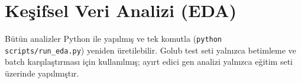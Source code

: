 


\section{Keşifsel Veri Analizi (EDA)}
Bütün analizler Python ile yapılmış ve tek komutla (\texttt{python scripts/run\_eda.py}) yeniden üretilebilir. Golub test seti yalnızca betimleme ve batch karşılaştırması için kullanılmış; ayırt edici gen analizi yalnızca eğitim seti üzerinde yapılmıştır.

